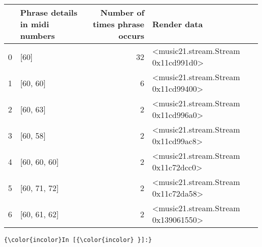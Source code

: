 \documentclass[11pt]{article}
\begin{document}
    \begin{tabular}{llrl}
\toprule
{} & Phrase details in midi numbers &  Number of times phrase occurs &                          Render data \\
\midrule
0 &  [60] &  32 &  <music21.stream.Stream 0x11cd991d0> \\
1 &  [60, 60] &  6 &  <music21.stream.Stream 0x11cd99400> \\
2 &  [60, 63] &  2 &  <music21.stream.Stream 0x11cd996a0> \\
3 &  [60, 58] &  2 &  <music21.stream.Stream 0x11cd99ac8> \\
4 &  [60, 60, 60] &  2 &  <music21.stream.Stream 0x11c72dcc0> \\
5 &  [60, 71, 72] &  2 &  <music21.stream.Stream 0x11c72da58> \\
6 &  [60, 61, 62] &  2 &  <music21.stream.Stream 0x139061550> \\
\bottomrule
\end{tabular}

    

    \begin{Verbatim}[commandchars=\\\{\}]
{\color{incolor}In [{\color{incolor} }]:} 
\end{Verbatim}


    
    
    
    
\end{document}
